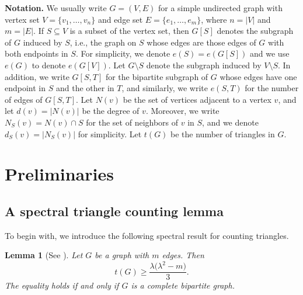 \documentclass[11pt]{article}
\newtheorem{lemma}[theorem]{Lemma}
\begin{document}
\medskip 


\noindent 
{\bf Notation.} 
We usually write $G=(V,E)$ for a simple undirected 
graph with vertex set 
$V=\{v_1,\ldots ,v_n\}$ and edge set $E=\{e_1,\ldots ,e_m\}$, where $n=|V|$ and $m=|E|$.   
If $S\subseteq V$ is a subset of the vertex set, then 
$G[S]$ denotes the subgraph of $G$ induced by $S$, 
i.e., the graph on $S$ whose edges are those edges of $G$ 
with both endpoints in $S$. 
For simplicity, we denote $e(S)=e(G[S])$ 
and we use $e(G)$ to denote $e(G[V])$.     
Let $G \setminus S$ denote the subgraph induced by $V\setminus S$.  
In addition, we write $G[S,T]$ for the bipartite subgraph of $G$ whose edges have one endpoint in $S$ and the other in $T$,   and similarly, we write $e(S,T)$ for the number of edges of $G[S,T]$.  
Let $N(v)$ be the set of vertices adjacent to a vertex $v$,  and let $d(v)=|N(v)|$ be the degree of $v$. 
Moreover, we write $N_S(v)= N(v) \cap S$ 
for the set of neighbors of $v$ in $S$, 
and we denote $d_S(v)=|N_S(v)|$ for simplicity. 
Let $t(G)$ be the number of triangles in $G$. 




\section{Preliminaries}
\label{sec3}

\subsection{A spectral triangle counting lemma}

To begin with, we introduce the following spectral result for counting triangles.  

\begin{lemma}[See \cite{BN2007jctb,CFTZ20,NZ2021}] 
\label{thm-BN-CFTZ-NZ}
Let $G$ be a graph with $m$ edges. Then 
\begin{equation*} \label{eq-spectral-super-triangle}
t(G) \ge \frac{\lambda \bigl(\lambda^2 - m\bigr)}{3}. 
  \end{equation*}
  The equality holds if and only if $G$ is a complete bipartite graph. 
\end{lemma}
\end{document}
